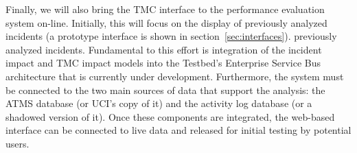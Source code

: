 Finally, we will also bring the TMC interface to the performance evaluation
system on-line.  Initially, this will focus on the display of
%
\iffull%
previously analyzed incidents (a prototype interface is shown in section~\ref{sec:interfaces}).%
\else%
previously analyzed incidents.%
\fi%
%
Fundamental to this effort is integration of the incident impact and TMC impact
models into the Testbed's Enterprise Service Bus architecture that is currently
under development.  Furthermore, the system must be connected to the two main
sources of data that support the analysis: the ATMS database (or UCI's copy of
it) and the activity log database (or a shadowed version of it).  Once these
components are integrated, the web-based interface can be connected to live data
and released for initial testing by potential users.



